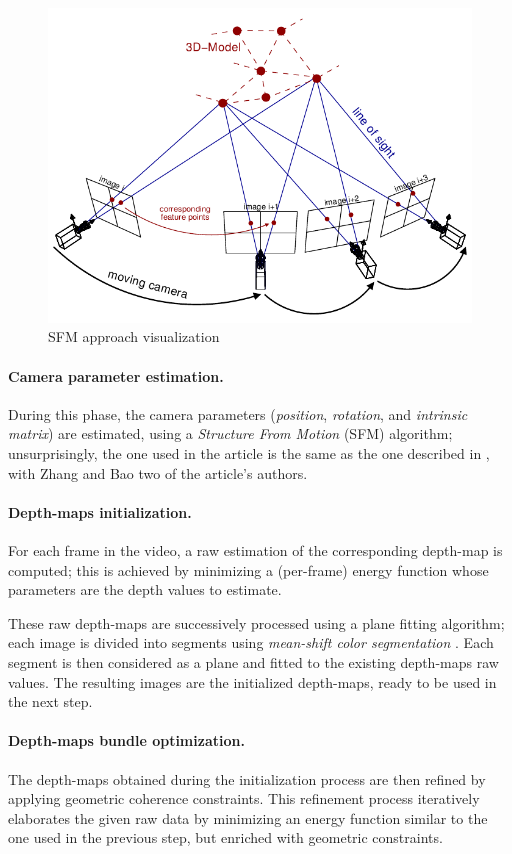 \documentclass[notitlepage,english]{hgbreport}
\begin{document}
\begin{figure}
	\centering
	\includegraphics[width=.34\textwidth]{sfm.png}
	\caption{ SFM approach visualization}
\end{figure}

\paragraph{Camera parameter estimation.} During this phase, the camera parameters (\ie \emph{position}, \emph{rotation}, and \emph{intrinsic matrix}) are estimated, using a \emph{Structure From Motion} (SFM) algorithm; unsurprisingly, the one used in the article is the same as the one described in \cite{Zhang2007}, with Zhang and Bao two of the article's authors.


\paragraph{Depth-maps initialization.} 
For each frame in the video, a raw estimation of the corresponding depth-map is computed; this is achieved by minimizing a (per-frame) energy function whose parameters are the depth values to estimate.

These raw depth-maps are successively processed using a plane fitting algorithm; each image is divided into segments using \emph{mean-shift color segmentation} \cite{Comaniciu202}. Each segment is then considered as a plane and fitted to the existing depth-maps raw values. The resulting images are the initialized depth-maps, ready to be used in the next step.

\paragraph{Depth-maps bundle optimization.} The depth-maps obtained during the initialization process are then refined by applying geometric coherence constraints. This refinement process iteratively elaborates the given raw data by minimizing an energy function similar to the one used in the previous step, but enriched with geometric constraints.
\end{document}
